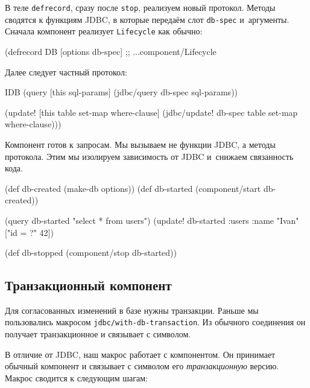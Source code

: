В теле \verb|defrecord|, сразу после \verb|stop|, реализуем новый
протокол. Методы сводятся к функциям JDBC, в которые передаём слот
\verb|db-spec| и~аргументы. Сначала компонент реализует \verb|Lifecycle| как
обычно:

\begin{english}
  \begin{clojure}
(defrecord DB [options db-spec]
  ;; ...component/Lifecycle
  \end{clojure}
\end{english}

\noindent
Далее следует частный протокол:

\begin{english}
  \begin{clojure}
  IDB
  (query [this sql-params]
    (jdbc/query db-spec sql-params))

  (update! [this table set-map where-clause]
    (jdbc/update! db-spec table set-map where-clause)))
  \end{clojure}
\end{english}

Компонент готов к запросам. Мы вызываем не функции JDBC, а методы
протокола. Этим мы изолируем зависимость от JDBC и~снижаем связанность кода.

\begin{english}
  \begin{clojure}
(def db-created (make-db options))
(def db-started (component/start db-created))

(query db-started "select * from users")
(update! db-started :users {:name "Ivan"} ["id = ?" 42])

(def db-stopped (component/stop db-started))
  \end{clojure}
\end{english}

\subsection{Транзакционный компонент}


Для согласованных изменений в базе нужны транзакции. Раньше мы пользовались
макросом \verb|jdbc/with-db-transaction|. Из обычного соединения он получает
транзакционное и связывает с символом.

В отличие от JDBC, наш макрос работает с компонентом. Он принимает обычный
компонент и связывает с символом его \emph{транзакционную} версию. Макрос
сводится к следующим шагам:

